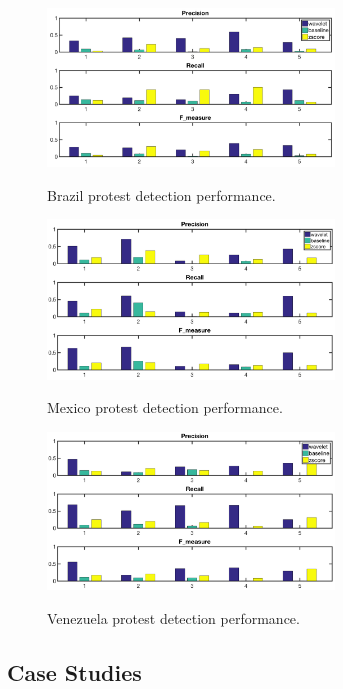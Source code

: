 \documentclass[conference]{IEEEtran}
\begin{document}
\begin{figure}[h]
	\centering
    {
		\includegraphics[width= 3in] {figures/performance_compare_bar_graph_brazil.png}
		\label{fig:distribution2}
	}
	\caption{Brazil protest detection performance.}
	\label{Brazil_performance}
\end{figure}


\begin{figure}[h]
	\centering
    {
		\includegraphics[width= 3in] {figures/performance_compare_bar_graph_mexico.png}
		\label{fig:distribution2}
	}
	\caption{Mexico protest detection performance.}
	\label{Mexico_performance}
\end{figure}


\begin{figure}[h]
	\centering
    {
		\includegraphics[width= 3in] {figures/performance_compare_bar_graph_venezuela.png}
		\label{fig:distribution2}
	}
	\caption{Venezuela protest detection performance.}
	\label{Venezuela_performance}
\end{figure}



\subsection{Case Studies}
\label{sec:highlighted_results}
\end{document}
